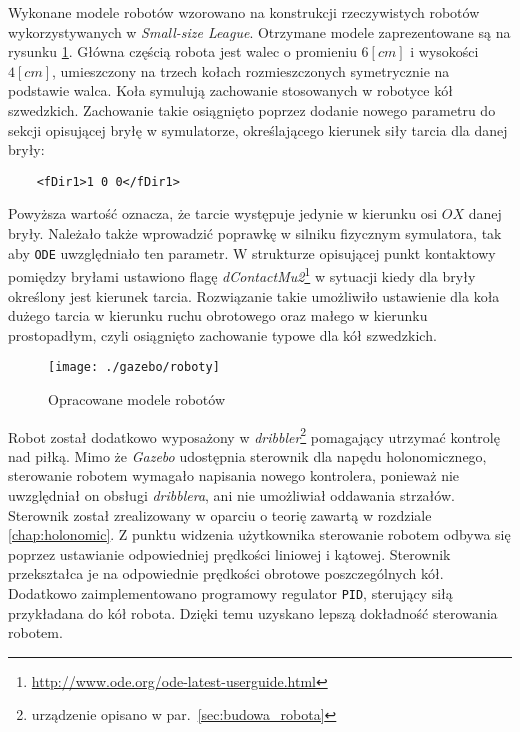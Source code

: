 	Wykonane modele robotów wzorowano na konstrukcji rzeczywistych robotów wykorzystywanych w \emph{Small-size League}. Otrzymane modele zaprezentowane są na rysunku \ref{fig:robots}.
	Główna częścią robota jest walec o promieniu $6[cm]$ i wysokości $4[cm]$, umieszczony na trzech kołach rozmieszczonych symetrycznie na podstawie walca.
	Koła symulują zachowanie stosowanych w robotyce kół szwedzkich. Zachowanie takie osiągnięto poprzez dodanie nowego parametru do sekcji opisującej bryłę w symulatorze,
	określającego kierunek siły tarcia dla danej bryły:
	\begin{lstlisting}	
	<fDir1>1 0 0</fDir1>
	\end{lstlisting}
	Powyższa wartość oznacza, że tarcie występuje jedynie w kierunku osi $OX$ danej bryły.
	Należało także wprowadzić poprawkę w silniku fizycznym symulatora, tak aby \texttt{ODE} uwzględniało ten parametr. W strukturze opisującej punkt kontaktowy pomiędzy bryłami
	ustawiono flagę \textit{dContactMu2}\protect\footnote{\url{http://www.ode.org/ode-latest-userguide.html}} w sytuacji kiedy dla bryły określony jest kierunek tarcia. Rozwiązanie takie umożliwiło ustawienie dla koła dużego tarcia w kierunku ruchu obrotowego oraz małego
	w kierunku prostopadłym, czyli osiągnięto zachowanie typowe dla kół szwedzkich.
	\begin{figure}[H]
	\centering
	\texttt{[image: ./gazebo/roboty]}
	\caption{Opracowane modele robotów  \label{fig:robots}}
	\end{figure}
	Robot został dodatkowo wyposażony w \textit{dribbler}\protect\footnote{urządzenie opisano w par.~\ref{sec:budowa_robota}} pomagający utrzymać kontrolę nad piłką.
	Mimo że \textit{Gazebo} udostępnia sterownik dla napędu holonomicznego, sterowanie robotem wymagało napisania nowego kontrolera, ponieważ nie uwzględniał on obsługi
	\textit{dribblera}, ani nie umożliwiał oddawania strzałów. Sterownik został zrealizowany w oparciu o teorię zawartą w rozdziale \ref{chap:holonomic}. Z punktu widzenia użytkownika
	sterowanie robotem odbywa się poprzez ustawianie odpowiedniej prędkości liniowej i kątowej. Sterownik przekształca je na odpowiednie prędkości obrotowe poszczególnych kół.
	Dodatkowo zaimplementowano programowy regulator \texttt{PID}, sterujący siłą przykładana do kół robota. Dzięki temu uzyskano lepszą dokładność sterowania robotem.
